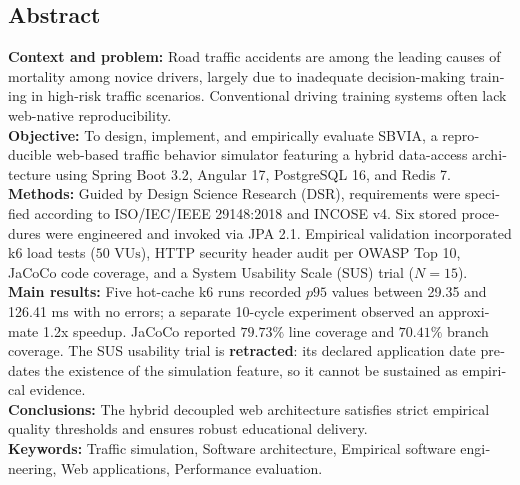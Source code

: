 \documentclass[11pt,a4paper]{report}
\begin{document}
\vspace{1cm}
\begin{otherlanguage}{english}
\chapter*{Abstract}
\textbf{Context and problem:} Road traffic accidents are among the leading causes of mortality among novice drivers, largely due to inadequate decision-making training in high-risk traffic scenarios. Conventional driving training systems often lack web-native reproducibility. \\
\textbf{Objective:} To design, implement, and empirically evaluate SBVIA, a reproducible web-based traffic behavior simulator featuring a hybrid data-access architecture using Spring Boot 3.2, Angular 17, PostgreSQL 16, and Redis 7. \\
\textbf{Methods:} Guided by Design Science Research (DSR), requirements were specified according to ISO/IEC/IEEE 29148:2018 and INCOSE v4. Six stored procedures were engineered and invoked via JPA 2.1. Empirical validation incorporated k6 load tests ($50\text{ VUs}$), HTTP security header audit per OWASP Top 10, JaCoCo code coverage, and a System Usability Scale (SUS) trial ($N=15$). \\
\textbf{Main results:} Five hot-cache k6 runs recorded $p95$ values between 29.35 and 126.41 ms with no errors; a separate 10-cycle experiment observed an approximate 1.2x speedup. JaCoCo reported $79.73\%$ line coverage and $70.41\%$ branch coverage. The SUS usability trial is \textbf{retracted}: its declared application date predates the existence of the simulation feature, so it cannot be sustained as empirical evidence. \\
\textbf{Conclusions:} The hybrid decoupled web architecture satisfies strict empirical quality thresholds and ensures robust educational delivery. \\
\textbf{Keywords:} Traffic simulation, Software architecture, Empirical software engineering, Web applications, Performance evaluation.
\end{otherlanguage}

\tableofcontents
\listoffigures
\listoftables
\lstlistoflistings
\end{document}
